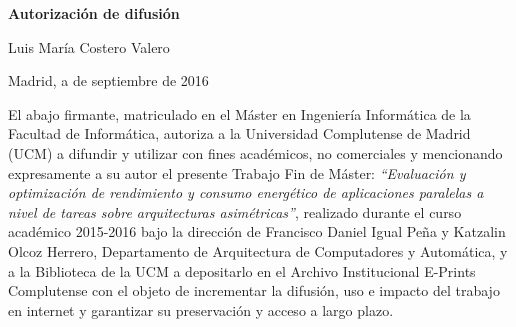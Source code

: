 % 

\cleardoublepage

\thispagestyle{empty}

\begin{center}

{\bf \Huge Autorización de difusión}

\vspace{1cm}

% 
   \large Luis María Costero Valero
      
   \vspace{0.5cm}

% 
   Madrid, a  de septiembre de 2016\\

   \vspace{0.5cm} \end{center}

 El abajo firmante, matriculado en el Máster en Ingeniería Informática de
 la Facultad de Informática, autoriza a la Universidad Complutense de
 Madrid (UCM) a difundir y utilizar con fines académicos, no comerciales y
 mencionando expresamente a su autor el presente Trabajo Fin de Máster:
 {\em ``Evaluación y optimización de rendimiento y consumo energético de
   aplicaciones paralelas a nivel de tareas sobre arquitecturas
   asimétricas''}, realizado durante el curso académico 2015-2016 bajo la
 dirección de Francisco Daniel Igual Peña y Katzalin Olcoz Herrero,
 Departamento de Arquitectura de Computadores y Automática, y a la
 Biblioteca de la UCM a depositarlo en el Archivo Institucional E-Prints
 Complutense con el objeto de incrementar la difusión, uso e impacto del
 trabajo en internet y garantizar su preservación y acceso a largo plazo.

